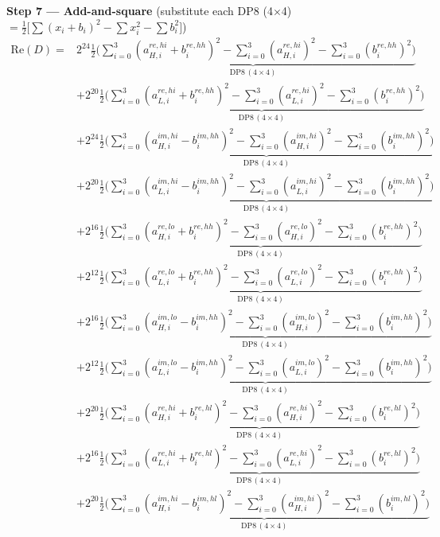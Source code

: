 \documentclass[fleqn]{article}
\newcommand{\DPop}[3]{\mathrm{DP#1}\,(#2\!\times\!#3)}
\begin{document}
\textbf{Step 7 --- Add-and-square}\quad
{\small(substitute each DP8 (4$\times$4) $= \tfrac{1}{2}\big[\sum(x_i{+}b_i)^2 - \sum x_i^2 - \sum b_i^2\big]$)}
\begin{align*}
\mathrm{Re}(D) = {}
  & 2^{24}\underbrace{\tfrac{1}{2}\Big(\sum_{i=0}^{3}(a_{H,i}^{re,hi}{+}b_i^{re,hh})^2 - \sum_{i=0}^{3}(a_{H,i}^{re,hi})^2 - \sum_{i=0}^{3}(b_i^{re,hh})^2\Big)}_{\DPop{8}{4}{4}} \\[0.5em]
  & + 2^{20}\underbrace{\tfrac{1}{2}\Big(\sum_{i=0}^{3}(a_{L,i}^{re,hi}{+}b_i^{re,hh})^2 - \sum_{i=0}^{3}(a_{L,i}^{re,hi})^2 - \sum_{i=0}^{3}(b_i^{re,hh})^2\Big)}_{\DPop{8}{4}{4}} \\[0.5em]
  & + 2^{24}\underbrace{\tfrac{1}{2}\Big(\sum_{i=0}^{3}(a_{H,i}^{im,hi}{-}b_i^{im,hh})^2 - \sum_{i=0}^{3}(a_{H,i}^{im,hi})^2 - \sum_{i=0}^{3}(b_i^{im,hh})^2\Big)}_{\DPop{8}{4}{4}} \\[0.5em]
  & + 2^{20}\underbrace{\tfrac{1}{2}\Big(\sum_{i=0}^{3}(a_{L,i}^{im,hi}{-}b_i^{im,hh})^2 - \sum_{i=0}^{3}(a_{L,i}^{im,hi})^2 - \sum_{i=0}^{3}(b_i^{im,hh})^2\Big)}_{\DPop{8}{4}{4}} \\[0.5em]
  & + 2^{16}\underbrace{\tfrac{1}{2}\Big(\sum_{i=0}^{3}(a_{H,i}^{re,lo}{+}b_i^{re,hh})^2 - \sum_{i=0}^{3}(a_{H,i}^{re,lo})^2 - \sum_{i=0}^{3}(b_i^{re,hh})^2\Big)}_{\DPop{8}{4}{4}} \\[0.5em]
  & + 2^{12}\underbrace{\tfrac{1}{2}\Big(\sum_{i=0}^{3}(a_{L,i}^{re,lo}{+}b_i^{re,hh})^2 - \sum_{i=0}^{3}(a_{L,i}^{re,lo})^2 - \sum_{i=0}^{3}(b_i^{re,hh})^2\Big)}_{\DPop{8}{4}{4}} \\[0.5em]
  & + 2^{16}\underbrace{\tfrac{1}{2}\Big(\sum_{i=0}^{3}(a_{H,i}^{im,lo}{-}b_i^{im,hh})^2 - \sum_{i=0}^{3}(a_{H,i}^{im,lo})^2 - \sum_{i=0}^{3}(b_i^{im,hh})^2\Big)}_{\DPop{8}{4}{4}} \\[0.5em]
  & + 2^{12}\underbrace{\tfrac{1}{2}\Big(\sum_{i=0}^{3}(a_{L,i}^{im,lo}{-}b_i^{im,hh})^2 - \sum_{i=0}^{3}(a_{L,i}^{im,lo})^2 - \sum_{i=0}^{3}(b_i^{im,hh})^2\Big)}_{\DPop{8}{4}{4}} \\[0.5em]
  & + 2^{20}\underbrace{\tfrac{1}{2}\Big(\sum_{i=0}^{3}(a_{H,i}^{re,hi}{+}b_i^{re,hl})^2 - \sum_{i=0}^{3}(a_{H,i}^{re,hi})^2 - \sum_{i=0}^{3}(b_i^{re,hl})^2\Big)}_{\DPop{8}{4}{4}} \\[0.5em]
  & + 2^{16}\underbrace{\tfrac{1}{2}\Big(\sum_{i=0}^{3}(a_{L,i}^{re,hi}{+}b_i^{re,hl})^2 - \sum_{i=0}^{3}(a_{L,i}^{re,hi})^2 - \sum_{i=0}^{3}(b_i^{re,hl})^2\Big)}_{\DPop{8}{4}{4}} \\[0.5em]
  & + 2^{20}\underbrace{\tfrac{1}{2}\Big(\sum_{i=0}^{3}(a_{H,i}^{im,hi}{-}b_i^{im,hl})^2 - \sum_{i=0}^{3}(a_{H,i}^{im,hi})^2 - \sum_{i=0}^{3}(b_i^{im,hl})^2\Big)}_{\DPop{8}{4}{4}} \\[0.5em]

\end{align*}
\end{document}
